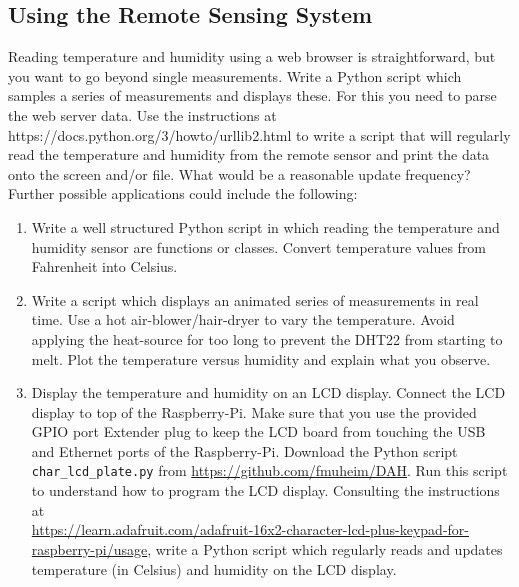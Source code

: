 \subsection{Using the  Remote Sensing System}

Reading temperature and humidity using a web browser is 
straightforward, but you want to go beyond single measurements.
Write a Python script which samples a series of measurements
and displays these. For this you need to parse the web server data.
Use the instructions at
https://docs.python.org/3/howto/urllib2.html
to write a script that will regularly read the temperature and humidity from
the remote sensor and print the data onto the screen and/or file. What would be a reasonable
update frequency? Further possible applications could include the following:

\begin{enumerate}

\item Write a  well structured Python script in which reading the temperature and humidity sensor are
functions or classes.  Convert temperature values from Fahrenheit into Celsius.

\item Write a script which displays an animated series of measurements in real time.
Use a hot air-blower/hair-dryer to vary the temperature. 
Avoid applying the heat-source for too long to prevent the DHT22 from starting to melt.
Plot the temperature versus humidity 
and explain what you observe.
 
\item Display the temperature and humidity on an  LCD display. 
Connect the LCD display to top of the Raspberry-Pi. 
Make sure that you use the provided GPIO port Extender plug to keep the LCD board from touching the  USB and Ethernet ports of the Raspberry-Pi. 
Download the Python script {\tt  char\_lcd\_plate.py} from  \url{https://github.com/fmuheim/DAH}. Run this script to understand how to program the LCD display. Consulting the instructions at \\
\url{https://learn.adafruit.com/adafruit-16x2-character-lcd-plus-keypad-for-raspberry-pi/usage}, 
write a Python script which regularly reads  and updates temperature (in Celsius) and humidity 
on the LCD display.

\end{enumerate}


